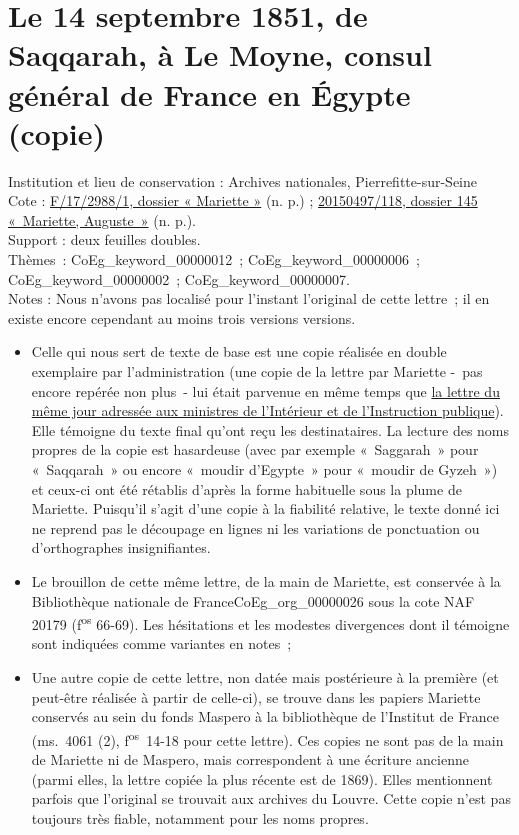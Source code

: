 \documentclass{book}
\begin{document}
\section*{Le 14 septembre 1851, de Saqqarah, à Le Moyne, consul général de France en Égypte (copie)}
{\footnotesize
\noindent Institution et lieu de conservation : Archives nationales, Pierrefitte-sur-Seine\\
Cote : \hyperlink{CoEg_Mariette_ms_002}{F/17/2988/1, dossier « Mariette »} (n. p.) ; \hyperlink{CoEg_Mariette_ms_001}{20150497/118, dossier 145 «~Mariette, Auguste~»} (n. p.).\\
Support : deux feuilles doubles.\\
Thèmes~: \gls{CoEg_keyword_00000012}~; \gls{CoEg_keyword_00000006}~; \gls{CoEg_keyword_00000002}~;  \gls{CoEg_keyword_00000007}.\\
Notes : Nous n’avons pas localisé pour l’instant l’original de cette lettre~; il en existe encore cependant au moins trois versions versions. 
\begin{itemize} \item Celle qui nous sert de texte de base est une copie réalisée en double exemplaire par l’administration (une copie de la lettre par Mariette -~pas encore repérée non plus~- lui était parvenue en même temps que \hyperlink{CoEg_Mariette_1851-09-14b}{la lettre du même jour adressée aux ministres de l’Intérieur et de l’Instruction publique}). Elle témoigne du texte final qu’ont reçu les destinataires. La lecture des noms propres de la copie est hasardeuse (avec par exemple «~Saggarah~» pour «~Saqqarah~» ou encore «~moudir d’Egypte~» pour «~moudir de Gyzeh~») et ceux-ci ont été rétablis d'après la forme habituelle sous la plume de Mariette. Puisqu’il s’agit d’une copie à la fiabilité relative, le texte donné ici ne reprend pas le découpage en lignes ni les variations de ponctuation ou d’orthographes insignifiantes.
\item Le brouillon de cette même lettre, de la main de Mariette, est conservée à la Bibliothèque nationale de France\gls{CoEg_org_00000026} sous la cote NAF 20179 (f\textsuperscript{os} 66-69). Les hésitations et les modestes divergences dont il témoigne sont indiquées comme variantes en notes~;
\item Une autre copie de cette lettre, non datée mais postérieure à la première (et peut-être réalisée à partir de celle-ci), se trouve dans les papiers Mariette conservés au sein du fonds Maspero à la bibliothèque de l’Institut de France (ms.~4061 (2), f\textsuperscript{os}~14-18 pour cette lettre). Ces copies ne sont pas de la main de Mariette ni de Maspero, mais correspondent à une écriture ancienne (parmi elles, la lettre copiée la plus récente est de 1869). Elles mentionnent parfois que l’original se trouvait aux archives du Louvre. Cette copie n’est pas toujours très fiable, notamment pour les noms propres. \end{itemize}            }
\end{document}
